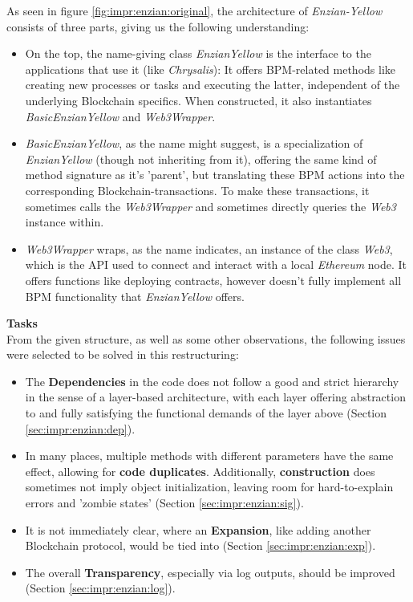 As seen in figure \ref{fig:impr:enzian:original}, the architecture of \emph{Enzian-Yellow} consists of three parts, giving us the following understanding:
\begin{itemize}
    \item On the top, the name-giving class \emph{EnzianYellow} is the interface to the applications that use it (like \emph{Chrysalis}): It offers BPM-related methods like creating new processes or tasks and executing the latter, independent of the underlying Blockchain specifics. When constructed, it also instantiates \emph{BasicEnzianYellow} and \emph{Web3Wrapper}.
    \item \emph{BasicEnzianYellow}, as the name might suggest, is a specialization of \emph{EnzianYellow} (though not inheriting from it), offering the same kind of method signature as it's 'parent', but translating these BPM actions into the corresponding Blockchain-transactions. To make these transactions, it sometimes calls the \emph{Web3Wrapper} and sometimes directly queries the \emph{Web3} instance within.
    \item \emph{Web3Wrapper} wraps, as the name indicates, an instance of the class \emph{Web3}, which is the API used to connect and interact with a local \emph{Ethereum} node. It offers functions like deploying contracts, however doesn't fully implement all BPM functionality that \emph{EnzianYellow} offers.
\end{itemize}

\textbf{Tasks} \\[0.2em]
From the given structure, as well as some other observations, the following issues were selected to be solved in this restructuring:
\begin{itemize}
\nopagebreak
    \item The \textbf{Dependencies} in the code does not follow a good and strict hierarchy in the sense of a layer-based architecture, with each layer offering abstraction to and fully satisfying the functional demands of the layer above (Section \ref{sec:impr:enzian:dep}).
    \item In many places, multiple methods with different parameters have the same effect, allowing for \textbf{code duplicates}. Additionally, \textbf{construction} does sometimes not imply object initialization, leaving room for hard-to-explain errors and 'zombie states' (Section \ref{sec:impr:enzian:sig}).
    \item It is not immediately clear, where an \textbf{Expansion}, like adding another Blockchain protocol, would be tied into (Section \ref{sec:impr:enzian:exp}). 
    \item The overall \textbf{Transparency}, especially via log outputs, should be improved (Section \ref{sec:impr:enzian:log}).
\end{itemize}

